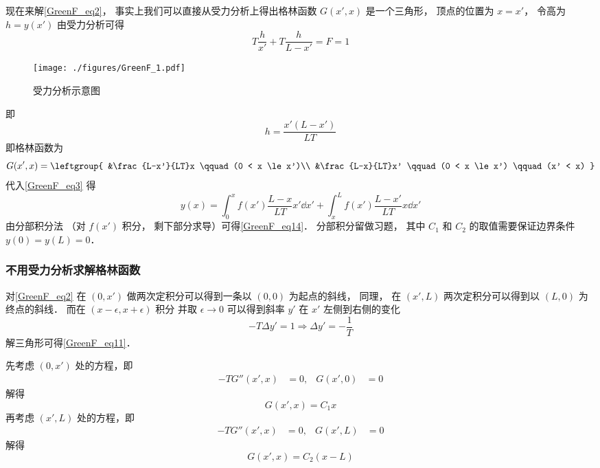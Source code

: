 现在来解\autoref{GreenF_eq2}， 事实上我们可以直接从受力分析上得出格林函数 $G(x', x)$ 是一个三角形， 顶点的位置为 $x = x'$， 令高为 $h = y(x')$ 由受力分析可得
\begin{equation}
T\frac{h}{x'} + T\frac{h}{L - x'} = F = 1
\end{equation}
\begin{figure}[ht]
\centering
\texttt{[image: ./figures/GreenF\_1.pdf]}
\caption{受力分析示意图} \label{GreenF_fig1}
\end{figure}
即
\begin{equation}\label{GreenF_eq11}
h = \frac{x' (L - x')}{LT}
\end{equation}
即格林函数为
\begin{equation}
G(x', x) = \leftgroup{
&\frac{L-x'}{LT}x \qquad (0 < x \le x')\\
&\frac{L-x}{LT}x' \qquad (0 < x \le x') \qquad (x' < x)
}\end{equation}
代入\autoref{GreenF_eq3} 得
\begin{equation}\label{GreenF_eq12}
y(x) = \int_0^x f(x') \frac{L-x}{LT}x'\dd{x'} + \int_x^L f(x')\frac{L-x'}{LT}x \dd{x'}
\end{equation}
由分部积分法 （对 $f(x')$ 积分， 剩下部分求导）可得\autoref{GreenF_eq14}． 分部积分留做习题， 其中 $C_1$ 和 $C_2$ 的取值需要保证边界条件 $y(0) = y(L) = 0$．

\subsubsection{不用受力分析求解格林函数}
对\autoref{GreenF_eq2} 在 $(0, x')$ 做两次定积分可以得到一条以 $(0,0)$ 为起点的斜线， 同理， 在 $(x', L)$ 两次定积分可以得到以 $(L, 0)$ 为终点的斜线． 而在 $(x-\epsilon, x+\epsilon)$ 积分 并取 $\epsilon\to 0$ 可以得到斜率 $y'$ 在 $x'$ 左侧到右侧的变化
\begin{equation}
-T\Delta y' = 1 \Longrightarrow \Delta y' = -\frac{1}{T}
\end{equation}
解三角形可得\autoref{GreenF_eq11}．

先考虑 $(0,x')$ 处的方程，即
\begin{align}
-TG''(x',x) &=0,&
G(x',0)&=0
\end{align}
解得
\begin{equation}
G(x',x)=C_1 x
\end{equation}
再考虑 $(x',L)$ 处的方程，即
\begin{align}
-TG''(x',x) &= 0,&
G(x',L) &= 0
\end{align}
解得
\begin{equation}
G(x',x) = C_2 (x-L)
\end{equation}


